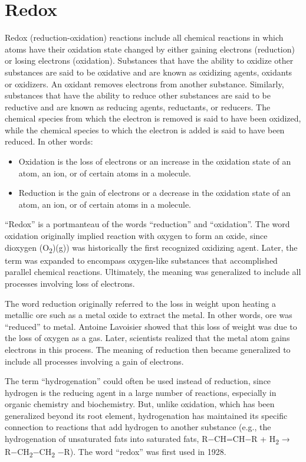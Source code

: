 \documentclass[
]{book}
\providecommand{\tightlist}{%
  \setlength{\itemsep}{0pt}\setlength{\parskip}{0pt}}
\begin{document}
\hypertarget{redox}{%
\section{Redox}\label{redox}}

Redox (reduction-oxidation) reactions include all chemical reactions in which atoms have their oxidation state changed by either gaining electrons (reduction) or losing electrons (oxidation). Substances that have the ability to oxidize other substances are said to be oxidative and are known as oxidizing agents, oxidants or oxidizers. An oxidant removes electrons from another substance. Similarly, substances that have the ability to reduce other substances are said to be reductive and are known as reducing agents, reductants, or reducers. The chemical species from which the electron is removed is said to have been oxidized, while the chemical species to which the electron is added is said to have been reduced. In other words:

\begin{itemize}
\tightlist
\item
  Oxidation is the loss of electrons or an increase in the oxidation state of an atom, an ion, or of certain atoms in a molecule.
\item
  Reduction is the gain of electrons or a decrease in the oxidation state of an atom, an ion, or of certain atoms in a molecule.
\end{itemize}

``Redox'' is a portmanteau of the words ``reduction'' and ``oxidation''. The word oxidation originally implied reaction with oxygen to form an oxide, since dioxygen (O\textsubscript{2})(g)) was historically the first recognized oxidizing agent. Later, the term was expanded to encompass oxygen-like substances that accomplished parallel chemical reactions. Ultimately, the meaning was generalized to include all processes involving loss of electrons.

The word reduction originally referred to the loss in weight upon heating a metallic ore such as a metal oxide to extract the metal. In other words, ore was ``reduced'' to metal. Antoine Lavoisier showed that this loss of weight was due to the loss of oxygen as a gas. Later, scientists realized that the metal atom gains electrons in this process. The meaning of reduction then became generalized to include all processes involving a gain of electrons.

The term ``hydrogenation'' could often be used instead of reduction, since hydrogen is the reducing agent in a large number of reactions, especially in organic chemistry and biochemistry. But, unlike oxidation, which has been generalized beyond its root element, hydrogenation has maintained its specific connection to reactions that add hydrogen to another substance (e.g., the hydrogenation of unsaturated fats into saturated fats, R−CH=CH−R + H\textsubscript{2} → R−CH\textsubscript{2}−CH\textsubscript{2} −R). The word ``redox'' was first used in 1928.
\end{document}

